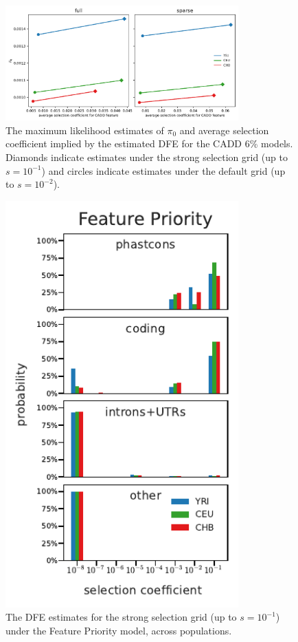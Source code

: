 \documentclass[11pt]{article}
\begin{document}
\begin{figure}[htbp]
    \label{suppfig:sel-ident}
  \centering
  \includegraphics[width=0.8\textwidth]{figures/supplementary/ave_sel_vs_pi0.pdf}

  \caption{The maximum likelihood estimates of $\pi_0$ and average selection
  coefficient implied by the estimated DFE for the CADD 6\% models. Diamonds
indicate estimates under the strong selection grid (up to $s=10^{-1}$) and
circles indicate estimates under the default grid (up to $s=10^{-2}$).}

\end{figure}

\begin{figure}[htbp]
    \label{suppfig:strong-sel-dfe-pop-phastcons}
  \centering
  \includegraphics[width=0.8\textwidth]{figures/supplementary/feature_priority_pop_dfe_strongselgrid.pdf}

  \caption{The DFE estimates for the strong selection grid (up to $s=10^{-1}$)
  under the Feature Priority model, across populations.}
\end{figure}
\end{document}
